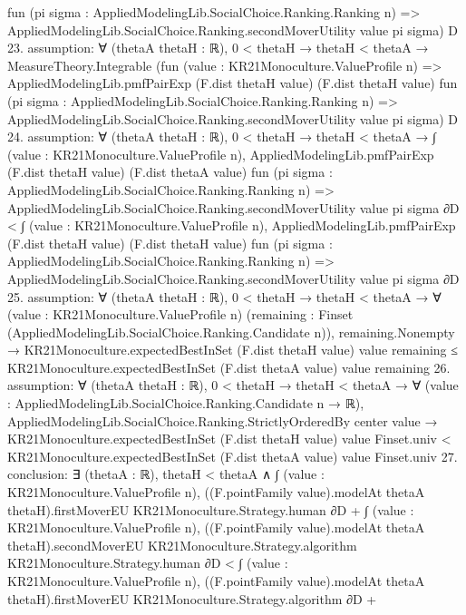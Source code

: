 \documentclass[10pt]{article}
\begin{document}
\begin{ReviewVerbatim}
            fun (pi sigma : AppliedModelingLib.SocialChoice.Ranking.Ranking n) =>
            AppliedModelingLib.SocialChoice.Ranking.secondMoverUtility value pi sigma)
        D
23. assumption: ∀ (thetaA thetaH : ℝ),
  0 < thetaH →
    thetaH < thetaA →
      MeasureTheory.Integrable
        (fun (value : KR21Monoculture.ValueProfile n) =>
          AppliedModelingLib.pmfPairExp (F.dist thetaH value) (F.dist thetaH value)
            fun (pi sigma : AppliedModelingLib.SocialChoice.Ranking.Ranking n) =>
            AppliedModelingLib.SocialChoice.Ranking.secondMoverUtility value pi sigma)
        D
24. assumption: ∀ (thetaA thetaH : ℝ),
  0 < thetaH →
    thetaH < thetaA →
      ∫ (value : KR21Monoculture.ValueProfile n),
          AppliedModelingLib.pmfPairExp (F.dist thetaH value) (F.dist thetaA value)
            fun (pi sigma : AppliedModelingLib.SocialChoice.Ranking.Ranking n) =>
            AppliedModelingLib.SocialChoice.Ranking.secondMoverUtility value pi sigma ∂D <
        ∫ (value : KR21Monoculture.ValueProfile n),
          AppliedModelingLib.pmfPairExp (F.dist thetaH value) (F.dist thetaH value)
            fun (pi sigma : AppliedModelingLib.SocialChoice.Ranking.Ranking n) =>
            AppliedModelingLib.SocialChoice.Ranking.secondMoverUtility value pi sigma ∂D
25. assumption: ∀ (thetaA thetaH : ℝ),
  0 < thetaH →
    thetaH < thetaA →
      ∀ (value : KR21Monoculture.ValueProfile n)
        (remaining : Finset (AppliedModelingLib.SocialChoice.Ranking.Candidate n)),
        remaining.Nonempty →
          KR21Monoculture.expectedBestInSet (F.dist thetaH value) value remaining ≤
            KR21Monoculture.expectedBestInSet (F.dist thetaA value) value remaining
26. assumption: ∀ (thetaA thetaH : ℝ),
  0 < thetaH →
    thetaH < thetaA →
      ∀ (value : AppliedModelingLib.SocialChoice.Ranking.Candidate n → ℝ),
        AppliedModelingLib.SocialChoice.Ranking.StrictlyOrderedBy center value →
          KR21Monoculture.expectedBestInSet (F.dist thetaH value) value Finset.univ <
            KR21Monoculture.expectedBestInSet (F.dist thetaA value) value Finset.univ
27. conclusion: ∃ (thetaA : ℝ),
  thetaH < thetaA ∧
    ∫ (value : KR21Monoculture.ValueProfile n),
            ((F.pointFamily value).modelAt thetaA thetaH).firstMoverEU KR21Monoculture.Strategy.human ∂D +
          ∫ (value : KR21Monoculture.ValueProfile n),
            ((F.pointFamily value).modelAt thetaA thetaH).secondMoverEU KR21Monoculture.Strategy.algorithm
              KR21Monoculture.Strategy.human ∂D <
        ∫ (value : KR21Monoculture.ValueProfile n),
            ((F.pointFamily value).modelAt thetaA thetaH).firstMoverEU KR21Monoculture.Strategy.algorithm ∂D +

\end{ReviewVerbatim}
\end{document}
